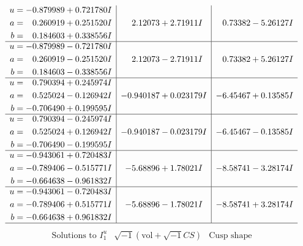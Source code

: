 \documentclass[1p]{elsarticle_modified}
\theoremstyle{definition}
\newcommand{\I}{\sqrt{-1}}
\begin{document}
$$\begin{array}{c|c|c}
\begin{aligned}
u &= -0.879989 + 0.721780 I \\
a &= \phantom{-}0.260919 + 0.251520 I \\
b &= \phantom{-}0.184603 + 0.338556 I\end{aligned}
 & \phantom{-}2.12073 + 2.71911 I & \phantom{-}0.73382 - 5.26127 I \\ \hline\begin{aligned}
u &= -0.879989 - 0.721780 I \\
a &= \phantom{-}0.260919 - 0.251520 I \\
b &= \phantom{-}0.184603 - 0.338556 I\end{aligned}
 & \phantom{-}2.12073 - 2.71911 I & \phantom{-}0.73382 + 5.26127 I \\ \hline\begin{aligned}
u &= \phantom{-}0.790394 + 0.245974 I \\
a &= \phantom{-}0.525024 - 0.126942 I \\
b &= -0.706490 + 0.199595 I\end{aligned}
 & -0.940187 + 0.023179 I & -6.45467 + 0.13585 I \\ \hline\begin{aligned}
u &= \phantom{-}0.790394 - 0.245974 I \\
a &= \phantom{-}0.525024 + 0.126942 I \\
b &= -0.706490 - 0.199595 I\end{aligned}
 & -0.940187 - 0.023179 I & -6.45467 - 0.13585 I \\ \hline\begin{aligned}
u &= -0.943061 + 0.720483 I \\
a &= -0.789406 - 0.515771 I \\
b &= -0.664638 - 0.961832 I\end{aligned}
 & -5.68896 + 1.78021 I & -8.58741 - 3.28174 I \\ \hline\begin{aligned}
u &= -0.943061 - 0.720483 I \\
a &= -0.789406 + 0.515771 I \\
b &= -0.664638 + 0.961832 I\end{aligned}
 & -5.68896 - 1.78021 I & -8.58741 + 3.28174 I\\
 \hline 
 \end{array}$$\newpage$$\begin{array}{c|c|c}  
\text{Solutions to }I^u_{1}& \I (\text{vol} + \sqrt{-1}CS) & \text{Cusp shape}\\
 \hline 
\begin{aligned}

\end{aligned}
\end{array}$$
\end{document}

